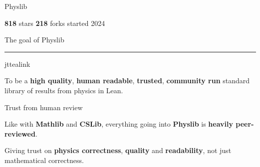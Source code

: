 \documentclass[aspectratio=169,10pt]{beamer}
\newcommand{\jtmeta}{\footnotesize}
\begin{document}
\begin{frame}{Physlib}
\begin{center}
\begin{tcolorbox}[enhanced, sharp corners, width=0.94\textwidth,
      colback=white, colframe=jtrule, boxrule=0.9pt,
      left=18pt,right=18pt,top=11pt,bottom=10pt]
    \vspace{8pt}{\color{jtrule}\rule{\linewidth}{0.8pt}}\vspace{5pt}

    {\jtmeta\color{jtgrey}%
      \;\textbf{818} stars
      \hspace{1.0em}\;\textbf{218} forks
      \hspace{1.0em}\;started 2024}
  \end{tcolorbox}
  \end{center}
  \vfill
\end{frame}

\begin{frame}{The goal of Physlib}
  \vfill
  {\color{jttealink}\rule{2.4cm}{1.8pt}}\par
  \vspace{14pt}
  \begin{jtquote}[top=16pt,bottom=16pt]{jttealink}
    {\fontsize{21}{29}\selectfont\color{jtslate}%
      To be a {\bfseries high quality}, {\bfseries human readable},
      {\bfseries trusted}, {\bfseries community run} standard library of
      results from physics in Lean.\par}
  \end{jtquote}
  \vfill
\end{frame}

\begin{frame}{Trust from human review}
  \vfill
  \begin{minipage}{0.94\textwidth}
    \raggedright
    {\fontsize{22}{30}\selectfont\color{jtslate}
      Like with {\bfseries Mathlib} and {\bfseries CSLib}, everything going
      into {\bfseries Physlib} is {\bfseries\color{jttealink}heavily
      peer-reviewed}.\par}
    \vspace{12pt}
    {\fontsize{17}{24}\selectfont\color{jtslate}
      Giving trust on {\bfseries physics correctness}, {\bfseries quality}
      and {\bfseries readability}, not just mathematical correctness.\par}
  \end{minipage}
  \vfill
\end{frame}
\end{document}
